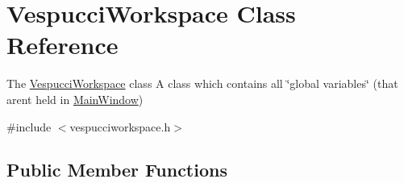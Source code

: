 \hypertarget{class_vespucci_workspace}{}\section{Vespucci\+Workspace Class Reference}
\label{class_vespucci_workspace}


The \hyperlink{class_vespucci_workspace}{Vespucci\+Workspace} class A class which contains all \char`\"{}global variables\char`\"{} (that aren\textquotesingle{}t held in \hyperlink{class_main_window}{Main\+Window})  




{\ttfamily \#include $<$vespucciworkspace.\+h$>$}

\subsection*{Public Member Functions}

